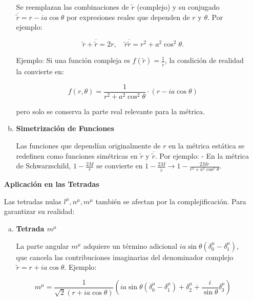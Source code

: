 \begin{enumerate}[1.]
\begin{note}
\begin{enumerate}[a.]
                        Se reemplazan las combinaciones de $\tilde{r}$ (complejo) y su conjugado $\overline{\tilde{r}} = r - ia \cos \theta$ por expresiones reales que dependen de $r$ y $\theta$. Por ejemplo:

                        $$
                            \tilde{r} + \overline{\tilde{r}} = 2r, \quad \tilde{r} \overline{\tilde{r}} = r^2 + a^2 \cos^2 \theta.
                        $$

                        Ejemplo:
                        Si una función compleja es $f(\tilde{r}) = \frac{1}{\tilde{r}}$, la condición de realidad la convierte en:

                        $$
                            f(r, \theta) = \frac{1}{r^2 + a^2 \cos^2 \theta} \cdot (r - ia \cos \theta)
                        $$

                        pero solo se conserva la parte real relevante para la métrica.
                  \item  \textbf{Simetrización de Funciones}

                        Las funciones que dependían originalmente de $r$ en la métrica estática se redefinen como funciones simétricas en $\tilde{r}$ y $\overline{\tilde{r}}$. Por ejemplo:
                        - En la métrica de Schwarzschild, $1 - \frac{2M}{r}$ se convierte en $1 - \frac{2M}{\tilde{r}} \rightarrow 1 - \frac{2Mr}{r^2 + a^2 \cos^2 \theta}$.

              \end{enumerate}



              \textbf{Aplicación en las Tetradas}

              Las tetradas nulas $l^\mu, n^\mu, m^\mu$ también se afectan por la complejificación. Para garantizar su realidad:

              \begin{enumerate}[a.]
                  \item \textbf{Tetrada $m^\mu$}

                        La parte angular $m^\mu$ adquiere un término adicional $ia \sin \theta (\delta_0^\mu - \delta_1^\mu)$, que cancela las contribuciones imaginarias del denominador complejo $\tilde{r} = r + ia \cos \theta$.
                        Ejemplo:

                        $$
                            m^\mu = \frac{1}{\sqrt{2}(r + ia \cos \theta)} \left( ia \sin \theta (\delta_0^\mu - \delta_1^\mu) + \delta_2^\mu + \frac{i}{\sin \theta} \delta_3^\mu \right)
                        $$


\end{enumerate}
\end{note}
\end{enumerate}
